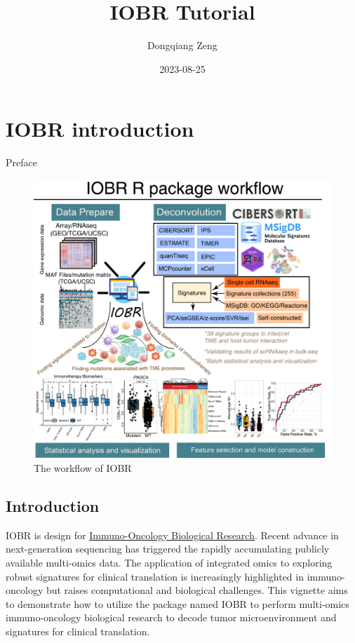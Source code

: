 \documentclass[
  12pt,
]{book}
\title{IOBR Tutorial}
\author{Dongqiang Zeng}
\date{2023-08-25}
\theoremstyle{definition}
\theoremstyle{definition}
\theoremstyle{definition}
\theoremstyle{definition}
\theoremstyle{remark}
\begin{document}
\maketitle

{
\setcounter{tocdepth}{1}
\tableofcontents
}
\hypertarget{iobr-introduction}{%
\chapter*{\texorpdfstring{\textbf{IOBR introduction}}{IOBR introduction}}\label{iobr-introduction}}

Preface

\begin{figure}

{\centering \includegraphics[width=0.95\linewidth]{./fig/IOBR-Workflow} 

}

\caption{The workflow of IOBR}\label{fig:unnamed-chunk-1}
\end{figure}

\hypertarget{introduction}{%
\section{Introduction}\label{introduction}}

IOBR is design for \href{https://github.com/IOBR/IOBR}{Immuno-Oncology Biological Research}.
Recent advance in next-generation sequencing has triggered the rapidly accumulating publicly available multi-omics data. The application of integrated omics to exploring robust signatures for clinical translation is increasingly highlighted in immuno-oncology but raises computational and biological challenges. This vignette aims to demonstrate how to utilize the package named IOBR to perform multi-omics immuno-oncology biological research to decode tumor microenvironment and signatures for clinical translation.
\end{document}
